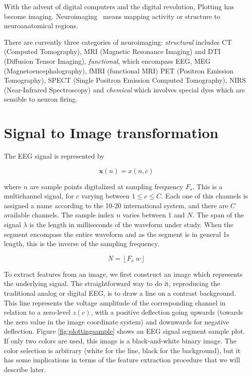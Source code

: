 
\begin{story}[Neuroimaging]
With the advent of digital computers and the digital revolution, Plotting has become imaging.  Neuroimaging~\cite{Freeman2013} means mapping activity or structure to neuroanatomical regions.

There are currently three categories of neuroimaging: \textit{structural} includes CT (Computed Tomography), MRI (Magnetic Resonance Imaging) and DTI (Diffusion Tensor Imaging), \textit{functional}, which encompass EEG, MEG (Magnetoencephalography), fMRI (functional MRI) PET (Positron Emission Tomography), SPECT (Single Positron Emission Computed Tomography), NIRS (Near-Infrared Spectroscopy) and \textit{chemical} which involves special dyes which are sensible to neuron firing.
\end{story}

\section{Signal to Image transformation}

The EEG signal is represented by

\begin{equation}
\mathbf{x}(n) = x(n,c)
\label{eq:zerolevel}
\end{equation}

\noindent where $n$ are sample points digitalized at sampling frequency $F_s$.  This is a multichannel signal, for $c$ varying between  $1 \leq c \leq C$.  Each one of this channels is assigned a name according to the 10-20 international system, and there are $C$ available channels. The sample index $n$ varies between $1$ and $N$.  The span of the signal $\lambda$ is the length in milliseconds of the waveform under study. When the segment encompass the entire waveform and as the segment is in general 1s length, this is the inverse of the sampling frequency.

\begin{equation}
N = \left\lfloor F_s \; w \right\rfloor
\label{eq:segmentlength}
\end{equation}

\vspace{3pt}

To extract features from an image, we first construct an image which represents the underlying signal.  The straightforward way to do it, reproducing the traditional analog or digital EEG, is to draw a line on a contrast background.  This line represents the voltage amplitude of the corresponding channel in relation to a zero-level $z(c)$, with a positive deflection going upwards (towards the zero value in the image coordinate system) and downwards for negative deflection.  Figure \ref{fig:plottingsample} shows an EEG signal segment sample plot.  If only two colors are used, this image is a black-and-white binary image.  The color selection is arbitrary (white for the line, black for the background), but it has some implications in terms of the feature extraction procedure that we will describe later.


